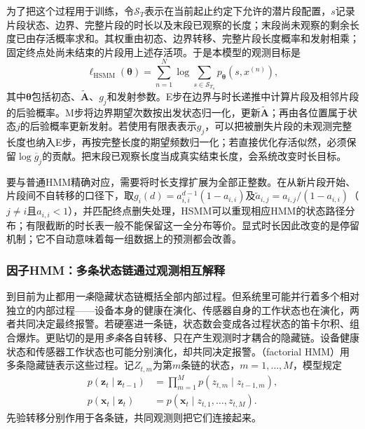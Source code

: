 为了把这个过程用于训练，令$\mathcal S_T$表示在当前起止约定下允许的潜片段配置，$s$记录片段状态、边界、完整片段的时长以及末段已观察的长度；末段尚未观察的剩余长度已由存活概率求和。其权重由初态、边界转移、完整片段长度概率和发射相乘；固定终点处尚未结束的片段用上述存活项。于是本模型的观测目标是
\begin{equation}
  \ell_{\mathrm{HSMM}}(\bm\theta)
    =\sum_{n=1}^{N}\log\sum_{s\in\mathcal S_{T_n}}
            p_{\bm\theta}(s,x^{(n)}),
  \label{eq:pgm-dynamic-hsmm-objective}
\end{equation}
其中$\bm\theta$包括初态、$\widetilde{\bm A}$、$g_j$和发射参数。E步在边界与时长递推中计算片段及相邻片段的后验概率。M步将边界期望次数按出发状态归一化，更新$\widetilde{\bm A}$；再由各位置属于状态$j$的后验概率更新发射。若使用有限表表示$g_j$，可以把被删失片段的未观测完整长度也纳入E步，再按完整长度的期望频数归一化；若直接优化存活似然，必须保留$\log\overline g_j$的贡献。把末段已观察长度当成真实结束长度，会系统改变时长目标。

要与普通HMM精确对应，需要将时长支撑扩展为全部正整数。在从新片段开始、片段间不自转移的口径下，取$g_i(d)=a_{i,i}^{d-1}(1-a_{i,i})$及$\widetilde a_{i,j}=a_{i,j}/(1-a_{i,i})$（$j\ne i$且$a_{i,i}<1$），并匹配终点删失处理，HSMM可以重现相应HMM的状态路径分布；有限截断的时长表一般不能保留这一全分布等价。显式时长因此改变的是停留机制；它不自动意味着每一组数据上的预测都会改善。

\subsubsection{因子HMM：多条状态链通过观测相互解释}
\label{sec:pgm-dynamic-factorial-model}

到目前为止都用\emph{一条}隐藏状态链概括全部内部过程。但系统里可能并行着多个相对独立的内部过程——设备本身的健康在演化、传感器自身的工作状态也在演化，两者共同决定最终报警。若硬塞进一条链，状态数会变成各过程状态的笛卡尔积、组合爆炸。更贴切的是用\emph{多条}各自转移、只在产生观测时才耦合的隐藏链。设备健康状态和传感器工作状态也可能分别演化，却共同决定报警。（factorial HMM）用多条隐藏链表示这些过程。记$Z_{t,m}$为第$m$条链的状态，$m=1,\ldots,M$，模型规定
\begin{equation}
  \begin{aligned}
    p(\bm{z}_t\mid\bm{z}_{t-1})
      &=\prod_{m=1}^{M}
        p(z_{t,m}\mid z_{t-1,m}),\\
    p(\bm{x}_t\mid\bm{z}_t)
      &=p(\bm{x}_t\mid z_{t,1},\ldots,z_{t,M}).
  \end{aligned}
  \label{eq:pgm-dynamic-factorial}
\end{equation}
先验转移分别作用于各条链，共同观测则把它们连接起来。

